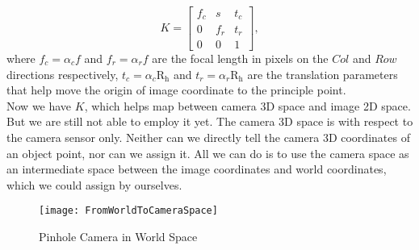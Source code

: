 \begin{equation}
K%
=  \begin{bmatrix} 
f_c & s & t_c \\
 0 & f_r & t_r \\
 0 & 0 & 1 \end{bmatrix} ,%
\label{intrinsicKmatrix}
\end{equation}%
\noindent
where \(f_c = \alpha_cf\) and \(f_r = \alpha_rf\) are the focal length in pixels on the \(Col\) and \(Row\) directions respectively,  \(t_c = \alpha_c\text{R}_\text{h}\) and \(t_r = \alpha_r\text{R}_\text{h}\) are the translation parameters that help move the origin of image coordinate to the principle point.
\\\indent
Now we have \(K\), which helps map between camera 3D space and image 2D space. But we are still not able to employ it yet. The camera 3D space is with respect to the camera sensor only. Neither can we directly tell the camera 3D coordinates of an object point, nor can we assign it. All we can do is to use the camera space as an intermediate space between the image coordinates and world coordinates, which we could assign by ourselves.
%
\begin{figure}[!t]
\centering
\texttt{[image: FromWorldToCameraSpace]}
\caption{Pinhole Camera in World Space}
\label{FromWorldToCameraSpace}
\end{figure}%
%

